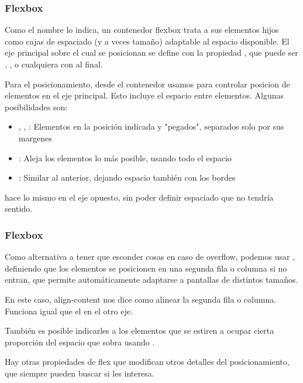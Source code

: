 \begin{frame}
    \frametitle{Flexbox}

    Como el nombre lo indica, un contenedor flexbox trata a sus elementos hijos 
    como cajas de espaciado (y a veces tamaño) adaptable al espacio disponible. El eje principal 
    sobre el cual se posicionan se define con la propiedad , que puede
    ser , , o cualquiera con  al final. 

    Para el posicionamiento, desde el contenedor usamos  para controlar 
    posicion de elementos en el eje principal. Esto incluye el espacio entre elementos. 
    Algunas posibilidades son:  
    
    \begin{itemize}
        \item {}, , : Elementos en la posición 
            indicada y "pegados", separados solo por sus margenes
        \item {}: Aleja los elementos lo más posible, usando todo el espacio
        \item {}: Similar al anterior, dejando espacio también con los bordes
    \end{itemize}
    
     hace lo mismo en el eje opuesto, sin poder definir espaciado que no 
    tendría sentido.

\end{frame}

\begin{frame}
    \frametitle{Flexbox}
    
    Como alternativa a tener que esconder cosas en caso de overflow, podemos usar , 
    definiendo que los elementos se posicionen en una segunda fila o columna si no entran, 
    que permite automáticamente adaptarse a pantallas de distintos tamaños.

    En este caso, align-content nos dice como alinear la segunda fila o columna. Funciona igual que
    el  en el otro eje. 

    También es posible indicarles a los elementos que se estiren a ocupar cierta proporción del 
    espacio que sobra usando .

    Hay otras propiedades de flex que modifican otros detalles del posicionamiento, que siempre
    pueden buscar si les interesa.

\end{frame}


